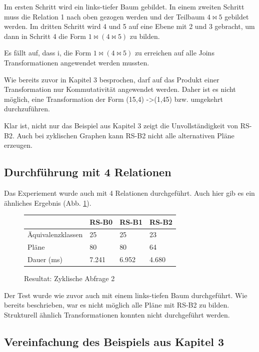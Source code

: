 Im ersten Schritt wird ein links-tiefer Baum gebildet.
In einem zweiten Schritt muss die Relation 1 nach oben gezogen werden und der Teilbaum $4 \Join 5$ gebildet werden. Im dritten Schritt wird 4 und 5 auf eine Ebene mit 2 und 3 gebracht, um dann in Schritt 4 die Form $1 \Join (4 \Join 5)$ zu bilden.

Es fällt auf, dass i, die Form $1 \Join (4 \Join 5)$ zu erreichen auf alle Joins Transformationen angewendet werden mussten.


Wie bereits zuvor in Kapitel 3 besprochen, darf auf das Produkt einer Transformation nur Kommutativität angewendet werden. Daher ist es nicht möglich, eine Transformation der Form (15,4) -\textgreater (1,45) bzw. umgekehrt durchzuführen.


Klar ist, nicht nur das Beispiel aus Kapitel 3 zeigt die Unvollständigkeit von RS-B2. Auch bei zyklischen Graphen kann RS-B2 nicht alle alternativen Pläne erzeugen.


\subsection{Durchführung mit 4 Relationen}

Das Experiement wurde auch mit 4 Relationen durchgeführt. Auch hier gib es ein ähnliches Ergebnis (Abb. \ref{ResCylceJoin2}).

\begin{figure}[ht]
  \centering
  \begin{tabular}{|l|l|l|l|}
\hline
                  & RS-B0  & RS-B1  & RS-B2  \\ \hline
Äquivalenzklassen & 25     & 25     & 23     \\ \hline
Pläne             & 80    & 80    & 64    \\ \hline
Dauer (ms)        & 7.241 & 6.952 & 4.680 \\ \hline
\end{tabular}
  \caption{Resultat: Zyklische Abfrage 2}
  \label{ResCylceJoin2}

\end{figure}


Der Test wurde wie zuvor auch mit einem links-tiefen Baum durchgeführt. Wie bereits beschrieben, war es nicht möglich alle Pläne mit RS-B2 zu bilden. Strukturell ähnlich Transformationen konnten nicht durchgeführt werden.

\subsection{Vereinfachung des Beispiels aus Kapitel 3}

